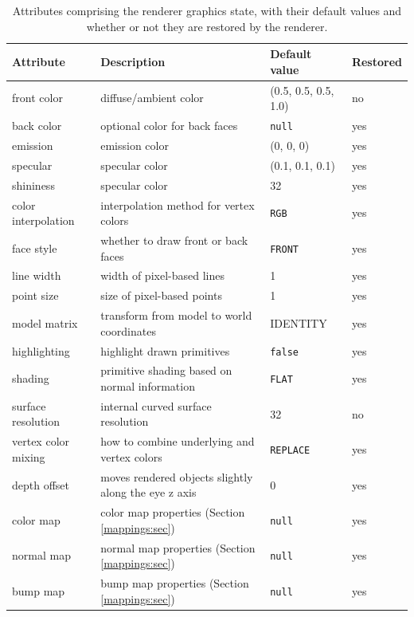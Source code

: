 %
\begin{table}[h]
\begin{center}
\begin{tabular}{|llll|}
\hline
Attribute & Description & Default value & Restored\\
\hline
front color & diffuse/ambient color & (0.5, 0.5, 0.5, 1.0) & no\\
back color & optional color for back faces & {\tt null} & yes\\
emission & emission color & (0, 0, 0) & yes\\
specular & specular color & (0.1, 0.1, 0.1) & yes\\
shininess & specular color & 32 & yes\\
\hline
color interpolation & interpolation method for vertex colors & {\tt RGB}& yes\\
face style & whether to draw front or back faces & {\tt FRONT}& yes\\
line width & width of pixel-based lines & 1& yes\\
point size & size of pixel-based points & 1& yes\\
\hline
model matrix & transform from model to world coordinates & IDENTITY& yes\\
highlighting & highlight drawn primitives & {\tt false}& yes\\
shading & primitive shading based on normal information & {\tt FLAT}& yes\\
surface resolution & internal curved surface resolution & 32& no\\
vertex color mixing & how to combine underlying and vertex colors &
{\tt REPLACE}& yes\\
depth offset & moves rendered objects slightly along the eye z axis & 0 & yes\\
\hline
color map & color map properties (Section \ref{mappings:sec}) & {\tt null}& yes\\
normal map & normal map properties (Section \ref{mappings:sec}) & 
{\tt null}& yes\\
bump map & bump map properties (Section \ref{mappings:sec}) & {\tt null}& yes\\
\hline
\end{tabular}
\end{center}
\caption{Attributes comprising the renderer graphics state, with their 
default values and whether or not they are restored by the renderer.}
\label{graphicsState:tab}
\end{table}
%

